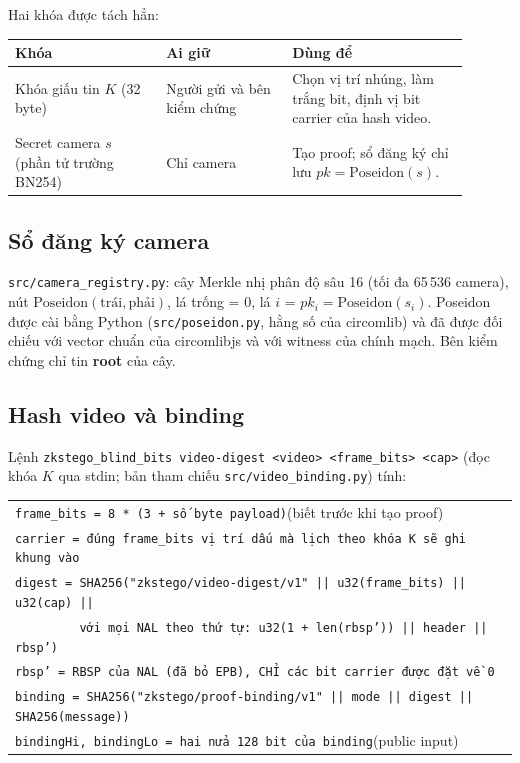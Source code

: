 \documentclass[11pt,a4paper]{article}
\begin{document}
Hai khóa được tách hẳn:

\begin{center}
\small
\begin{tabular}{p{0.30\linewidth}p{0.25\linewidth}p{0.35\linewidth}}
\toprule
Khóa & Ai giữ & Dùng để \\
\midrule
Khóa giấu tin \(K\) (32 byte) & Người gửi và bên kiểm chứng & Chọn vị trí nhúng, làm trắng bit, định vị bit carrier của hash video. \\
Secret camera \(s\) (phần tử trường BN254) & Chỉ camera & Tạo proof; sổ đăng ký chỉ lưu \(pk = \mathrm{Poseidon}(s)\). \\
\bottomrule
\end{tabular}
\end{center}

\subsection{Sổ đăng ký camera}

\nolinkurl{src/camera_registry.py}: cây Merkle nhị phân độ sâu 16 (tối đa 65\,536
camera), nút \(\mathrm{Poseidon}(\text{trái}, \text{phải})\), lá trống = 0, lá \(i\) =
\(pk_i = \mathrm{Poseidon}(s_i)\). Poseidon được cài bằng Python
(\nolinkurl{src/poseidon.py}, hằng số của circomlib) và đã được đối chiếu với vector
chuẩn của circomlibjs và với witness của chính mạch. Bên kiểm chứng chỉ tin
\textbf{root} của cây.

\subsection{Hash video và binding}

Lệnh \texttt{zkstego\_blind\_bits video-digest <video> <frame\_bits> <cap>} (đọc khóa
\(K\) qua stdin; bản tham chiếu \nolinkurl{src/video_binding.py}) tính:

\begin{center}
\footnotesize
\begin{tabular}{l}
\texttt{frame\_bits = 8 * (3 + số byte payload)}\quad (biết trước khi tạo proof) \\
\texttt{carrier = đúng frame\_bits vị trí dấu mà lịch theo khóa K sẽ ghi khung vào} \\
\texttt{digest = SHA256("zkstego/video-digest/v1" || u32(frame\_bits) || u32(cap) ||} \\
\texttt{\ \ \ \ \ \ \ \ \ với mọi NAL theo thứ tự: u32(1 + len(rbsp')) || header || rbsp')} \\
\texttt{rbsp' = RBSP của NAL (đã bỏ EPB), CHỈ các bit carrier được đặt về 0} \\[3pt]
\texttt{binding = SHA256("zkstego/proof-binding/v1" || mode || digest || SHA256(message))} \\
\texttt{bindingHi, bindingLo = hai nửa 128 bit của binding}\quad (public input) \\
\end{tabular}
\end{center}
\end{document}
